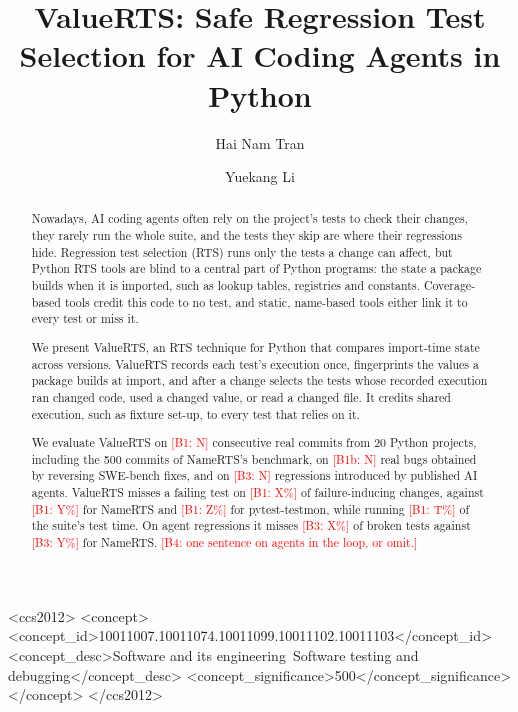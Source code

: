 \documentclass[acmsmall,screen,review,anonymous]{acmart}
\newcommand{\ph}[1]{\textcolor{red}{[#1]}}
\newcommand{\tool}{ValueRTS\xspace}
\begin{document}
\title{ValueRTS: Safe Regression Test Selection for AI Coding Agents in Python}
\author{Hai Nam Tran}
\author{Yuekang Li}

\begin{abstract}
Nowadays, AI coding agents often rely on the project's tests to check their changes,  they rarely run the whole suite, and the tests they skip are where their regressions hide. Regression test selection (RTS) runs only the tests a change can affect, but Python RTS tools are blind to a central part of Python programs: the state a package builds when it is imported, such as lookup tables, registries and constants. Coverage-based tools credit this code to no test, and static, name-based tools either link it to every test or miss it.

We present \tool, an RTS technique for Python that compares import-time state across versions. \tool records each test's execution once, fingerprints the values a package builds at import, and after a change selects the tests whose recorded execution ran changed code, used a changed value, or read a changed file. It credits shared execution, such as fixture set-up, to every test that relies on it.

We evaluate \tool on \ph{B1: N} consecutive real commits from 20 Python projects, including the 500 commits of NameRTS's benchmark, on \ph{B1b: N} real bugs obtained by reversing SWE-bench fixes, and on \ph{B3: N} regressions introduced by published AI agents. \tool misses a failing test on \ph{B1: X\%} of failure-inducing changes, against \ph{B1: Y\%} for NameRTS and \ph{B1: Z\%} for pytest-testmon, while running \ph{B1: T\%} of the suite's test time. On agent regressions it misses \ph{B3: X\%} of broken tests against \ph{B3: Y\%} for NameRTS. \ph{B4: one sentence on agents in the loop, or omit.}
\end{abstract}

\begin{CCSXML}
<ccs2012>
<concept><concept_id>10011007.10011074.10011099.10011102.10011103</concept_id>
<concept_desc>Software and its engineering~Software testing and debugging</concept_desc>
<concept_significance>500</concept_significance></concept>
</ccs2012>
\end{CCSXML}
\end{document}
